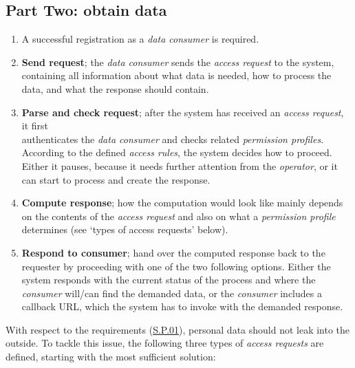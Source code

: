 \documentclass[12pt,english,a4paper,titlepage,cleardoublepage=empty,dottedtoc]{report}
\begin{document}
\subsection*{Part Two: obtain data}\label{part-two-obtain-data}

\begin{enumerate}
\def\labelenumi{\arabic{enumi})}
\setcounter{enumi}{-1}
\item
  A successful registration as a \emph{data consumer} is required.
\item
  \textbf{Send request}; the \emph{data consumer} sends the \emph{access
  request} to the system, containing all information about what data is
  needed, how to process the data, and what the response should contain.
\item
  \textbf{Parse and check request}; after the system has received an
  \emph{access request}, it first\\
  authenticates the \emph{data consumer} and checks related
  \emph{permission profiles}. According to the defined \emph{access
  rules}, the system decides how to proceed. Either it pauses, because
  it needs further attention from the \emph{operator}, or it can start
  to process and create the response.
\item
  \textbf{Compute response}; how the computation would look like mainly
  depends on the contents of the \emph{access request} and also on what
  a \emph{permission profile} determines (see `types of access requests'
  below).
\item
  \textbf{Respond to consumer}; hand over the computed response back to
  the requester by proceeding with one of the two following options.
  Either the system responds with the current status of the process and
  where the \emph{consumer} will/can find the demanded data, or the
  \emph{consumer} includes a callback URL, which the system has to
  invoke with the demanded response.
\end{enumerate}

With respect to the requirements (\protect\hyperlink{sp01}{S.P.01}),
personal data should not leak into the outside. To tackle this issue,
the following three types of \emph{access requests} are defined,
starting with the most sufficient solution:
\end{document}
